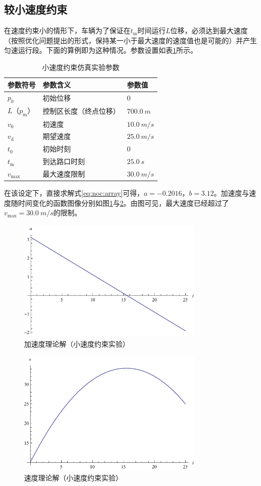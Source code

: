\subsection{较小速度约束}
在速度约束小的情形下，车辆为了保证在$t_\mathrm{m}$时间运行$L$位移，必须达到最大速度（按照优化问题提出的形式，保持某一小于最大速度的速度值也是可能的）并产生匀速运行段。下面的算例即为这种情况。参数设置如表\ref{tab:vsmall:param}所示。
\begin{table}[htbp]
\centering
\caption{小速度约束仿真实验参数}
\label{tab:vsmall:param}
\begin{tabular}{lll}
\toprule[1.5pt]
参数符号 & 参数含义 & 参数值 \\
\midrule[1pt]
$p_0$ & 初始位移 & $0$ \\
$L$（$p_\mathrm{m}$） & 控制区长度（终点位移） & $\SI{700.0}{m}$ \\
$v_0$ & 初速度 & $\SI{10.0}{m\per s}$ \\
$v_\mathrm{d}$ & 期望速度 & $\SI{25.0}{m\per s}$ \\
$t_0$ & 初始时刻 & $0$ \\
$t_\mathrm{m}$ & 到达路口时刻 & $\SI{25.0}{s}$ \\
$v_{\max}$ & 最大速度限制 & $\SI{30.0}{m\per s}$ \\
\bottomrule[1.5pt]
\end{tabular}
\end{table}

在该设定下，直接求解式\ref{eq:noc:array}可得，$a=-0.2016$，$b=3.12$。加速度与速度随时间变化的函数图像分别如图\ref{fig:na}与\ref{fig:nv}。由图可见，最大速度已经超过了$v_{\max}=\SI{30.0}{m\per s}$的限制。
\begin{figure}[htbp]
\centering
\includegraphics[width=9cm]{figures/vopt/na.pdf}
\caption{加速度理论解（小速度约束实验）}
\label{fig:na}
\end{figure}
\begin{figure}[htbp]
\centering
\includegraphics[width=9cm]{figures/vopt/nv.pdf}
\caption{速度理论解（小速度约束实验）}
\label{fig:nv}
\end{figure}

